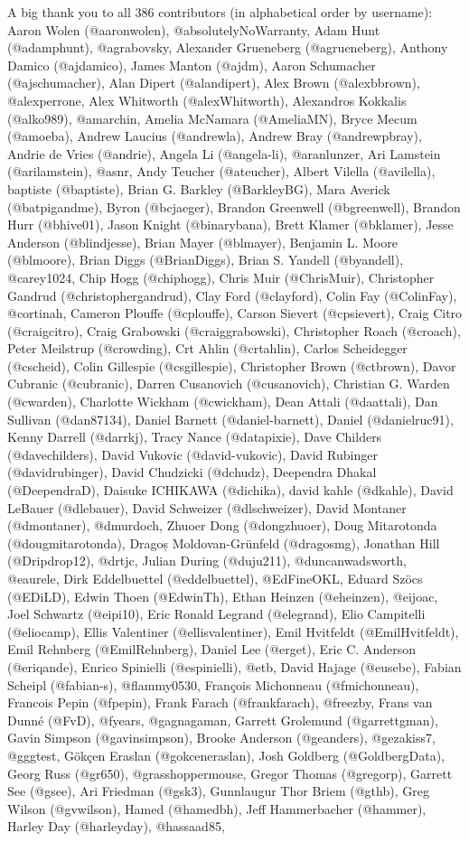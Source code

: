 \documentclass[
]{book}
\begin{document}
A big thank you to all 386 contributors (in alphabetical order by username): Aaron Wolen (@aaronwolen), @absolutelyNoWarranty, Adam Hunt (@adamphunt), @agrabovsky, Alexander Grueneberg (@agrueneberg), Anthony Damico (@ajdamico), James Manton (@ajdm), Aaron Schumacher (@ajschumacher), Alan Dipert (@alandipert), Alex Brown (@alexbbrown), @alexperrone, Alex Whitworth (@alexWhitworth), Alexandros Kokkalis (@alko989), @amarchin, Amelia McNamara (@AmeliaMN), Bryce Mecum (@amoeba), Andrew Laucius (@andrewla), Andrew Bray (@andrewpbray), Andrie de Vries (@andrie), Angela Li (@angela-li), @aranlunzer, Ari Lamstein (@arilamstein), @asnr, Andy Teucher (@ateucher), Albert Vilella (@avilella), baptiste (@baptiste), Brian G. Barkley (@BarkleyBG), Mara Averick (@batpigandme), Byron (@bcjaeger), Brandon Greenwell (@bgreenwell), Brandon Hurr (@bhive01), Jason Knight (@binarybana), Brett Klamer (@bklamer), Jesse Anderson (@blindjesse), Brian Mayer (@blmayer), Benjamin L. Moore (@blmoore), Brian Diggs (@BrianDiggs), Brian S. Yandell (@byandell), @carey1024, Chip Hogg (@chiphogg), Chris Muir (@ChrisMuir), Christopher Gandrud (@christophergandrud), Clay Ford (@clayford), Colin Fay (@ColinFay), @cortinah, Cameron Plouffe (@cplouffe), Carson Sievert (@cpsievert), Craig Citro (@craigcitro), Craig Grabowski (@craiggrabowski), Christopher Roach (@croach), Peter Meilstrup (@crowding), Crt Ahlin (@crtahlin), Carlos Scheidegger (@cscheid), Colin Gillespie (@csgillespie), Christopher Brown (@ctbrown), Davor Cubranic (@cubranic), Darren Cusanovich (@cusanovich), Christian G. Warden (@cwarden), Charlotte Wickham (@cwickham), Dean Attali (@daattali), Dan Sullivan (@dan87134), Daniel Barnett (@daniel-barnett), Daniel (@danielruc91), Kenny Darrell (@darrkj), Tracy Nance (@datapixie), Dave Childers (@davechilders), David Vukovic (@david-vukovic), David Rubinger (@davidrubinger), David Chudzicki (@dchudz), Deependra Dhakal (@DeependraD), Daisuke ICHIKAWA (@dichika), david kahle (@dkahle), David LeBauer (@dlebauer), David Schweizer (@dlschweizer), David Montaner (@dmontaner), @dmurdoch, Zhuoer Dong (@dongzhuoer), Doug Mitarotonda (@dougmitarotonda), Dragoș Moldovan-Grünfeld (@dragosmg), Jonathan Hill (@Dripdrop12), @drtjc, Julian During (@duju211), @duncanwadsworth, @eaurele, Dirk Eddelbuettel (@eddelbuettel), @EdFineOKL, Eduard Szöcs (@EDiLD), Edwin Thoen (@EdwinTh), Ethan Heinzen (@eheinzen), @eijoac, Joel Schwartz (@eipi10), Eric Ronald Legrand (@elegrand), Elio Campitelli (@eliocamp), Ellis Valentiner (@ellisvalentiner), Emil Hvitfeldt (@EmilHvitfeldt), Emil Rehnberg (@EmilRehnberg), Daniel Lee (@erget), Eric C. Anderson (@eriqande), Enrico Spinielli (@espinielli), @etb, David Hajage (@eusebe), Fabian Scheipl (@fabian-s), @flammy0530, François Michonneau (@fmichonneau), Francois Pepin (@fpepin), Frank Farach (@frankfarach), @freezby, Frans van Dunné (@FvD), @fyears, @gagnagaman, Garrett Grolemund (@garrettgman), Gavin Simpson (@gavinsimpson), Brooke Anderson (@geanders), @gezakiss7, @gggtest, Gökçen Eraslan (@gokceneraslan), Josh Goldberg (@GoldbergData), Georg Russ (@gr650), @grasshoppermouse, Gregor Thomas (@gregorp), Garrett See (@gsee), Ari Friedman (@gsk3), Gunnlaugur Thor Briem (@gthb), Greg Wilson (@gvwilson), Hamed (@hamedbh), Jeff Hammerbacher (@hammer), Harley Day (@harleyday), @hassaad85, 
\end{document}
